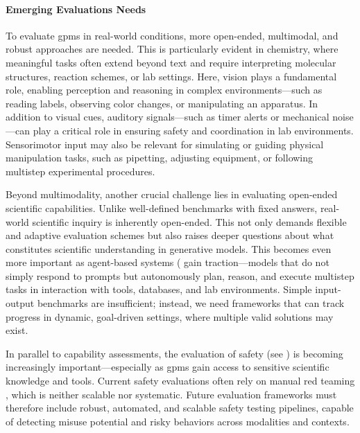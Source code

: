 \documentclass[11pt, oneside]{article}
\providecommand{\DIFaddbegin}{} %
\providecommand{\DIFaddend}{} %
\newcommand{\DIFaddincludegraphics}[2][]{{\color{blue}\fbox{\DIFOincludegraphics[#1]{#2}}}} %
\DeclareRobustCommand{\DIFaddbegin}{\DIFOaddbegin \let\includegraphics\DIFaddincludegraphics} %
\DeclareRobustCommand{\DIFaddend}{\DIFOaddend \let\includegraphics\DIFOincludegraphics} %
\begin{document}
\paragraph{Emerging Evaluations Needs} To evaluate \glspl{gpm} in real-world conditions, more open-ended, multimodal, and robust approaches are needed. This is particularly evident in chemistry, where meaningful tasks often extend beyond text and require interpreting molecular structures, reaction schemes, or lab settings.
Here, vision plays a fundamental role, enabling perception and reasoning in complex environments---such as reading labels, observing color changes, or manipulating an apparatus. \autocite{Eppel2020computer}
In addition to visual cues, auditory signals---such as timer alerts or mechanical noise---can play a critical role in ensuring safety and coordination in lab environments. 
Sensorimotor input may also be relevant for simulating or guiding physical manipulation tasks, such as pipetting, adjusting equipment, or following multistep experimental procedures.


Beyond multimodality, another crucial challenge lies in evaluating open-ended scientific capabilities. 
Unlike well-defined benchmarks with fixed answers, real-world scientific inquiry is inherently open-ended.\autocite{mitchener2025bixbench0} This not only demands flexible and adaptive evaluation schemes but also raises deeper questions about what constitutes scientific understanding in generative models. 
This becomes even more important as agent-based systems ( gain traction---models that do not simply respond to prompts but autonomously plan, reason, and execute multistep tasks in interaction with tools, databases, and lab environments. \autocite{cao2024agents, mandal2024autonomous}
Simple input-output benchmarks are insufficient; instead, we need frameworks that can track progress in dynamic, goal-driven settings, where multiple valid solutions may exist. \DIFaddbegin \autocite{nie2025assessing} 
\DIFaddend 

In parallel to capability assessments, the evaluation of safety (see ) is becoming increasingly important---especially as \glspl{gpm} gain access to sensitive scientific knowledge and tools.\autocite{bran2024augmenting, boiko2023autonomous} 
Current safety evaluations often rely on manual red teaming , which is neither scalable nor systematic. 
Future evaluation frameworks must therefore include robust, automated, and scalable safety testing pipelines, capable of detecting misuse potential and risky behaviors across modalities and contexts.\autocite{goldstein2023generative}
\end{document}
